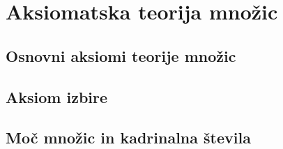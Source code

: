\chapter{Aksiomatska teorija množic}
\label{chap:zfc}

\section{Osnovni aksiomi teorije množic}
\label{sec:osnovni-aksiomi-mnozic}


\section{Aksiom izbire}
\label{sec:aksiom-izbire}


\section{Moč množic in kadrinalna števila}
\label{sec:kardinalna-stevila}



